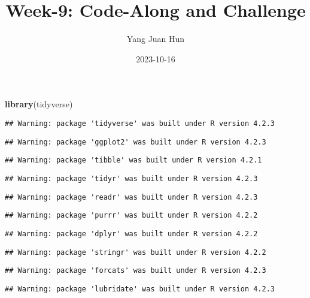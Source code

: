\documentclass[
]{article}
\title{Week-9: Code-Along and Challenge}
\author{Yang Juan Hun}
\date{2023-10-16}
\newenvironment{Shaded}{\begin{snugshade}}{\end{snugshade}}
\newcommand{\FunctionTok}[1]{\textcolor[rgb]{0.13,0.29,0.53}{\textbf{#1}}}
\newcommand{\NormalTok}[1]{#1}
\begin{document}
\maketitle

\begin{Shaded}
\begin{Highlighting}[]
\FunctionTok{library}\NormalTok{(tidyverse)}
\end{Highlighting}
\end{Shaded}

\begin{verbatim}
## Warning: package 'tidyverse' was built under R version 4.2.3
\end{verbatim}

\begin{verbatim}
## Warning: package 'ggplot2' was built under R version 4.2.3
\end{verbatim}

\begin{verbatim}
## Warning: package 'tibble' was built under R version 4.2.1
\end{verbatim}

\begin{verbatim}
## Warning: package 'tidyr' was built under R version 4.2.3
\end{verbatim}

\begin{verbatim}
## Warning: package 'readr' was built under R version 4.2.3
\end{verbatim}

\begin{verbatim}
## Warning: package 'purrr' was built under R version 4.2.2
\end{verbatim}

\begin{verbatim}
## Warning: package 'dplyr' was built under R version 4.2.2
\end{verbatim}

\begin{verbatim}
## Warning: package 'stringr' was built under R version 4.2.2
\end{verbatim}

\begin{verbatim}
## Warning: package 'forcats' was built under R version 4.2.3
\end{verbatim}

\begin{verbatim}
## Warning: package 'lubridate' was built under R version 4.2.3
\end{verbatim}
\end{document}
